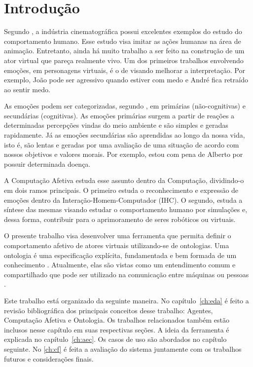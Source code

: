 \chapter{Introdução}

Segundo \citet{terzopoulos1998behavioral}, a indústria cinematográfica possui
excelentes exemplos do estudo do comportamento humano. Esse estudo visa imitar
as ações humanas na área de animação. Entretanto, ainda há muito trabalho a
ser feito na construção de um ator virtual que pareça realmente vivo. Um dos
primeiros trabalhos envolvendo emoções, em personagens virtuais, é o de
\citet{bates1994role} visando melhorar a interpretação. Por exemplo, João pode
ser agressivo quando estiver com medo e André fica retraído ao sentir medo.

As emoções podem ser categorizadas, segundo \citet{damasio2004erro}, em
primárias (não-cognitivas) e secundárias (cognitivas). As emoções primárias
surgem a partir de reações a determinadas percepções vindas do meio ambiente e
são simples e geradas rapidamente. Já as emoções secundárias são aprendidas ao
longo da nossa vida, isto é, são lentas e geradas por uma avaliação de uma
situação de acordo com nossos objetivos e valores morais. Por exemplo, estou
com pena de Alberto por possuir determinada doença.

A Computação Afetiva estuda esse assunto dentro da Computação, dividindo-o em
dois ramos principais. O primeiro estuda o reconhecimento e expressão de
emoções dentro da Interação-Homem-Computador (IHC). O segundo, estuda a
síntese das mesmas visando estudar o comportamento humano por simulações e,
dessa forma, contribuir para o aprimoramento de seres robóticos ou virtuais.

O presente trabalho visa desenvolver uma ferramenta que permita definir o
comportamento afetivo de atores virtuais utilizando-se de ontologias. Uma
ontologia é uma especificação explícita, fundamentada e bem formada de um
conhecimento \cite{gruber1993translation}. Atualmente, elas são vistas como um
entendimento comum e compartilhado que pode ser utilizado na comunicação entre
máquinas ou pessoas \cite{wks2008towards}.

Este trabalho está organizado da seguinte maneira. No capítulo~\ref{ch:eda}
é feito a revisão bibliográfica dos principais conceitos desse trabalho:
Agentes, Computação Afetiva e Ontologia. Os trabalhos relacionados também
estão inclusos nesse capítulo em suas respectivas seções. A ideia da
ferramenta é explicada no capítulo~\ref{ch:aec}. Os casos de uso são abordados no
capítulo seguinte. No \ref{ch:cf} é feita a avaliação do sistema juntamente
com os trabalhos futuros e considerações finais.
